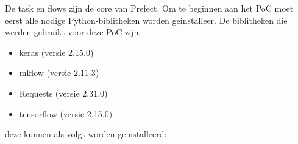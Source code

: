 De task en flows zijn de core van Prefect. Om te beginnen aan het PoC moet eerst alle nodige Python-biblitheken worden geinstalleer.
De biblitheken die werden gebruikt voor deze PoC zijn:
\begin{itemize}
    \item keras (versie 2.15.0)
    \item mlflow (versie 2.11.3)
    \item Requests (versie 2.31.0)
    \item tensorflow (versie 2.15.0)
\end{itemize}

deze kunnen als volgt worden geinstalleerd: 










